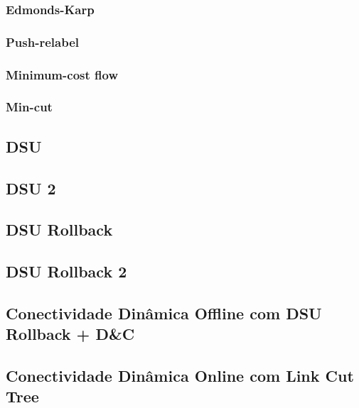 \subsubsection{Edmonds-Karp}


\subsubsection{Push-relabel}


\subsubsection{Minimum-cost flow}


\subsubsection{Min-cut}


\subsection{DSU}


\subsection{DSU 2}


\subsection{DSU Rollback}


\subsection{DSU Rollback 2}


\subsection{Conectividade Dinâmica Offline com DSU Rollback + D\&C}


\subsection{Conectividade Dinâmica Online com Link Cut Tree}


